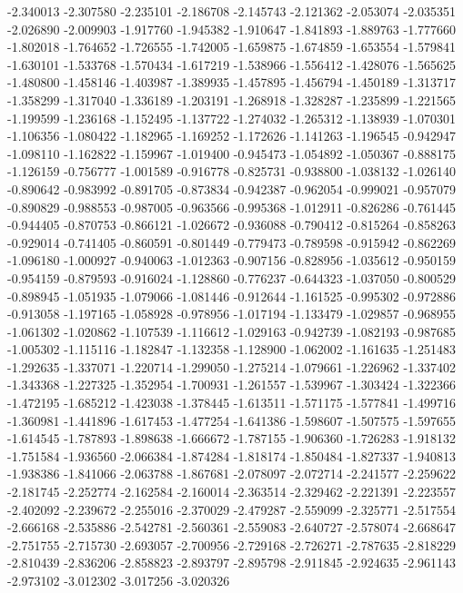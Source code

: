 -2.340013
-2.307580
-2.235101
-2.186708
-2.145743
-2.121362
-2.053074
-2.035351
-2.026890
-2.009903
-1.917760
-1.945382
-1.910647
-1.841893
-1.889763
-1.777660
-1.802018
-1.764652
-1.726555
-1.742005
-1.659875
-1.674859
-1.653554
-1.579841
-1.630101
-1.533768
-1.570434
-1.617219
-1.538966
-1.556412
-1.428076
-1.565625
-1.480800
-1.458146
-1.403987
-1.389935
-1.457895
-1.456794
-1.450189
-1.313717
-1.358299
-1.317040
-1.336189
-1.203191
-1.268918
-1.328287
-1.235899
-1.221565
-1.199599
-1.236168
-1.152495
-1.137722
-1.274032
-1.265312
-1.138939
-1.070301
-1.106356
-1.080422
-1.182965
-1.169252
-1.172626
-1.141263
-1.196545
-0.942947
-1.098110
-1.162822
-1.159967
-1.019400
-0.945473
-1.054892
-1.050367
-0.888175
-1.126159
-0.756777
-1.001589
-0.916778
-0.825731
-0.938800
-1.038132
-1.026140
-0.890642
-0.983992
-0.891705
-0.873834
-0.942387
-0.962054
-0.999021
-0.957079
-0.890829
-0.988553
-0.987005
-0.963566
-0.995368
-1.012911
-0.826286
-0.761445
-0.944405
-0.870753
-0.866121
-1.026672
-0.936088
-0.790412
-0.815264
-0.858263
-0.929014
-0.741405
-0.860591
-0.801449
-0.779473
-0.789598
-0.915942
-0.862269
-1.096180
-1.000927
-0.940063
-1.012363
-0.907156
-0.828956
-1.035612
-0.950159
-0.954159
-0.879593
-0.916024
-1.128860
-0.776237
-0.644323
-1.037050
-0.800529
-0.898945
-1.051935
-1.079066
-1.081446
-0.912644
-1.161525
-0.995302
-0.972886
-0.913058
-1.197165
-1.058928
-0.978956
-1.017194
-1.133479
-1.029857
-0.968955
-1.061302
-1.020862
-1.107539
-1.116612
-1.029163
-0.942739
-1.082193
-0.987685
-1.005302
-1.115116
-1.182847
-1.132358
-1.128900
-1.062002
-1.161635
-1.251483
-1.292635
-1.337071
-1.220714
-1.299050
-1.275214
-1.079661
-1.226962
-1.337402
-1.343368
-1.227325
-1.352954
-1.700931
-1.261557
-1.539967
-1.303424
-1.322366
-1.472195
-1.685212
-1.423038
-1.378445
-1.613511
-1.571175
-1.577841
-1.499716
-1.360981
-1.441896
-1.617453
-1.477254
-1.641386
-1.598607
-1.507575
-1.597655
-1.614545
-1.787893
-1.898638
-1.666672
-1.787155
-1.906360
-1.726283
-1.918132
-1.751584
-1.936560
-2.066384
-1.874284
-1.818174
-1.850484
-1.827337
-1.940813
-1.938386
-1.841066
-2.063788
-1.867681
-2.078097
-2.072714
-2.241577
-2.259622
-2.181745
-2.252774
-2.162584
-2.160014
-2.363514
-2.329462
-2.221391
-2.223557
-2.402092
-2.239672
-2.255016
-2.370029
-2.479287
-2.559099
-2.325771
-2.517554
-2.666168
-2.535886
-2.542781
-2.560361
-2.559083
-2.640727
-2.578074
-2.668647
-2.751755
-2.715730
-2.693057
-2.700956
-2.729168
-2.726271
-2.787635
-2.818229
-2.810439
-2.836206
-2.858823
-2.893797
-2.895798
-2.911845
-2.924635
-2.961143
-2.973102
-3.012302
-3.017256
-3.020326
